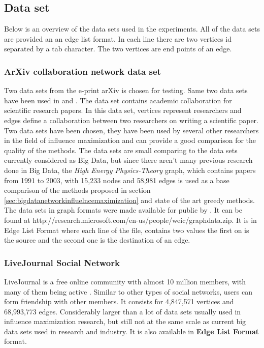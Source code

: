 \documentclass[english]{tktltiki}
\begin{document}
\subsection{Data set}
Below is an overview of the data sets used in the experiments. All of the data sets are provided an an edge list format. In each line there are two vertices id separated by a tab character. The two vertices are end points of an edge. 
\subsubsection{ArXiv collaboration network data set}
Two data sets from the e-print arXiv is chosen for testing. Same two data sets have been used in \cite{kempe03} and \cite{chen09}. The data set contains academic collaboration for scientific research papers. In this data set, vertices represent researchers and edges define a collaboration between two researchers on writing a scientific paper. Two data sets have been chosen, they have been used by several other researchers in the field of influence maximization and can provide a good comparison for the quality of the methods. The data sets are small comparing to the data sets currently considered as Big Data, but since there aren't many previous research done in Big Data, the \textit{High Energy Physics-Theory} graph, which contains papers from 1991 to 2003, with 15,233 nodes and 58,981 edges is used as a base comparison of the methods proposed in section \ref{sec:bigdatanetworkinfluelncemaximization} and state of the art greedy methods.
The data sets in graph formats were made available for public by \cite{chen09}. It can be found at http://research.microsoft.com/en-us/people/weic/graphdata.zip. It is in Edge List Format where each line of the file, contains two values the first on is the source and the second one is the destination of an edge.

\subsubsection{LiveJournal Social Network}
LiveJournal is a free online community with almost 10 million members, with many of them being active . Similar to other types of social networks, users can form friendship with other members. It consists for 4,847,571 vertices and 68,993,773 edges. Considerably larger than a lot of data sets usually used in influence maximization research, but still not at the same scale as current big data sets used in research and industry.  It is also available in \textbf{Edge List Format} format.
\end{document}

